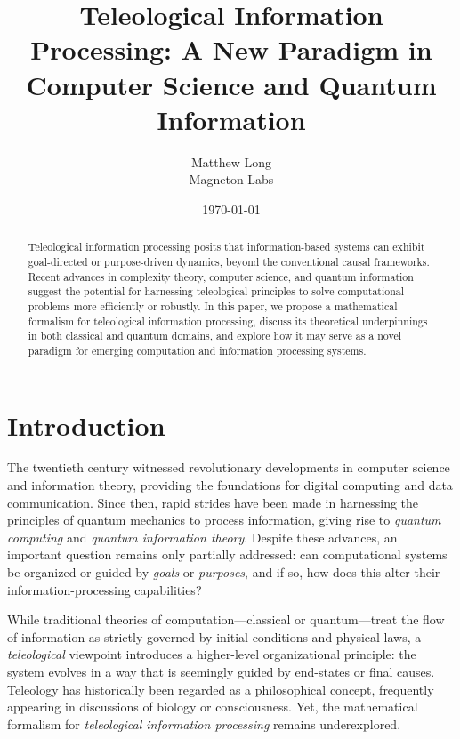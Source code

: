 \documentclass[12pt]{article}
\title{\textbf{Teleological Information Processing: A New Paradigm in Computer Science and Quantum Information}}
\author{Matthew Long \\
Magneton Labs}
\date{\today}
\begin{document}
\maketitle

\begin{abstract}
Teleological information processing posits that information-based systems can exhibit goal-directed or purpose-driven dynamics, beyond the conventional causal frameworks. Recent advances in complexity theory, computer science, and quantum information suggest the potential for harnessing teleological principles to solve computational problems more efficiently or robustly. In this paper, we propose a mathematical formalism for teleological information processing, discuss its theoretical underpinnings in both classical and quantum domains, and explore how it may serve as a novel paradigm for emerging computation and information processing systems. 
\end{abstract}

\tableofcontents

\newpage

\section{Introduction}

The twentieth century witnessed revolutionary developments in computer science and information theory, providing the foundations for digital computing and data communication. Since then, rapid strides have been made in harnessing the principles of quantum mechanics to process information, giving rise to \emph{quantum computing} and \emph{quantum information theory}. Despite these advances, an important question remains only partially addressed: can computational systems be organized or guided by \emph{goals} or \emph{purposes}, and if so, how does this alter their information-processing capabilities?

While traditional theories of computation---classical or quantum---treat the flow of information as strictly governed by initial conditions and physical laws, a \emph{teleological} viewpoint introduces a higher-level organizational principle: the system evolves in a way that is seemingly guided by end-states or final causes. Teleology has historically been regarded as a philosophical concept, frequently appearing in discussions of biology or consciousness. Yet, the mathematical formalism for \emph{teleological information processing} remains underexplored. 
\end{document}
